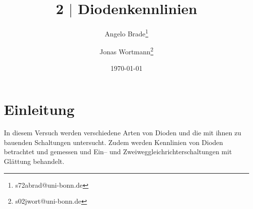 \documentclass[a4paper,10pt]{article}
\numberwithin{equation}{section}
\begin{document}
\begin{titlepage}
        \title{2 $|$ Diodenkennlinien}
        \author[1]{Angelo Brade\thanks{s72abrad@uni-bonn.de}}
        \author[1]{Jonas Wortmann\thanks{s02jwort@uni-bonn.de}}
        \date{\today}
\end{titlepage}

\maketitle
{}


\newpage


\fancyhead[R]{\thepage}
\fancyfoot[C]{}

\tableofcontents


\newpage


\fancyhead[L]{\leftmark}

\section{Einleitung}
In diesem Versuch werden verschiedene Arten von Dioden und die mit ihnen zu bauenden Schaltungen untersucht.
Zudem werden Kennlinien von Dioden betrachtet und gemessen und Ein-- und Zweiweggleichrichterschaltungen mit Glättung behandelt.

\newpage
\end{document}
